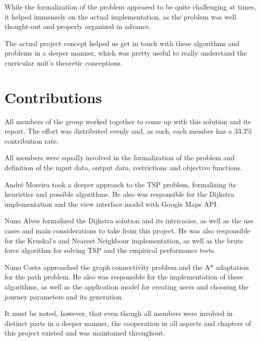 \documentclass[a4paper, 12pt]{report}
\begin{document}
    While the formalization of the problem appeared to be quite challenging at times, it helped immensely on the actual implementation, as the problem was well thought-out and properly organized in advance.
    
    The actual project concept helped us get in touch with these algorithms and problems in a deeper manner, which was pretty useful to really understand the curricular unit's theoretic conceptions.
    
    \pagebreak
    
    \chapter{Contributions}
    
    All members of the group worked together to come up with this solution and its report. The effort was distributed evenly and, as such, each member has a 33.3\% contribution rate. 
    
    All members were equally involved in the formalization of the problem and definition of the input data, output data, restrictions and objective functions.
    
    André Moreira took a deeper approach to the TSP problem, formalizing its heuristics and possible algorithms. He also was responsible for the Dijkstra implementation and the view interface model with Google Maps API.
    
    Nuno Alves formalized the Dijkstra solution and its intricacies, as well as the use cases and main considerations to take from this project. He was also responsible for the Kruskal's and Nearest Neighbour implementation, as well as the brute force algorithm for solving TSP and the empirical performance tests.
    
    Nuno Costa approached the graph connectivity problem and the A* adaptation for the path problem. He also was responsible for the implementation of these algorithms, as well as the application model for creating users and choosing the journey parameters and its generation.
    
    It must be noted, however, that even though all members were involved in distinct parts in a deeper manner, the cooperation in all aspects and chapters of this project existed and was maintained throughout. 
    
    \pagebreak
    
    \printbibliography
    
\end{document}

